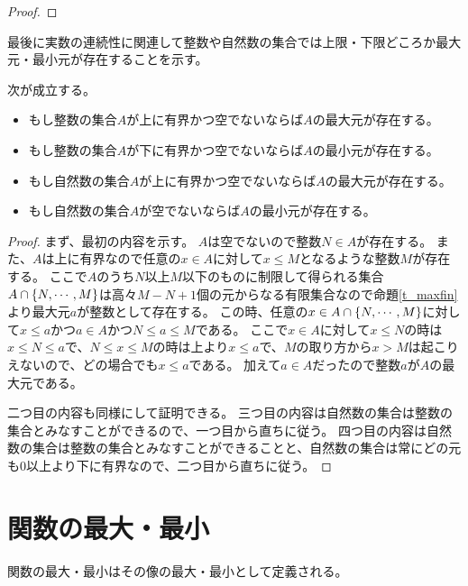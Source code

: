 \begin{proof}
\end{proof}

最後に実数の連続性に関連して整数や自然数の集合では上限・下限どころか最大元・最小元が存在することを示す。

\begin{proposition}
\label{t_maxdisc}
次が成立する。
\begin{itemize}
\item
もし整数の集合$A$が上に有界かつ空でないならば$A$の最大元が存在する。
\item
もし整数の集合$A$が下に有界かつ空でないならば$A$の最小元が存在する。
\item
もし自然数の集合$A$が上に有界かつ空でないならば$A$の最大元が存在する。
\item
もし自然数の集合$A$が空でないならば$A$の最小元が存在する。
\end{itemize}
\end{proposition}

\begin{proof}
まず、最初の内容を示す。
$A$は空でないので整数$N \in A$が存在する。
また、$A$は上に有界なので任意の$x \in A$に対して$x \le M$となるような整数$M$が存在する。
ここで$A$のうち$N$以上$M$以下のものに制限して得られる集合$A\cap\{ N, \cdots, M \}$は高々$M-N+1$個の元からなる有限集合なので命題\ref{t_maxfin}より最大元$a$が整数として存在する。
この時、任意の$x \in A\cap\{ N, \cdots, M \}$に対して$x \le a$かつ$a \in A$かつ$N \le a \le M$である。
ここで$x \in A$に対して$x \le N$の時は$x \le N \le a$で、$N \le x \le M$の時は上より$x \le a$で、$M$の取り方から$x > M$は起こりえないので、どの場合でも$x \le a$である。
加えて$a \in A$だったので整数$a$が$A$の最大元である。

二つ目の内容も同様にして証明できる。
三つ目の内容は自然数の集合は整数の集合とみなすことができるので、一つ目から直ちに従う。
四つ目の内容は自然数の集合は整数の集合とみなすことができることと、自然数の集合は常にどの元も$0$以上より下に有界なので、二つ目から直ちに従う。
\end{proof}

\section{関数の最大・最小}

関数の最大・最小はその像の最大・最小として定義される。


